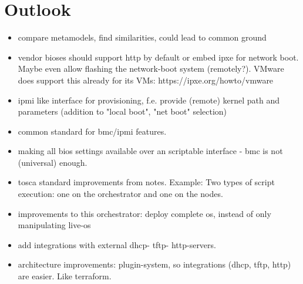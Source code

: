 \chapter{Outlook}



\begin{itemize}
  \item compare metamodels, find similarities, could lead to common ground
  \item vendor bioses should support http by default or embed ipxe for network boot. Maybe even allow flashing the network-boot system (remotely?). VMware does support this already for its VMs: https://ipxe.org/howto/vmware
  \item ipmi like interface for provisioning, f.e. provide (remote) kernel path and parameters (addition to "local boot", "net boot" selection)
  \item common standard for bmc/ipmi features.
  \item making all bios settings available over an scriptable interface - bmc is not (universal) enough.
  \item tosca standard improvements from notes. Example: Two types of script execution: one on the orchestrator and one on the nodes.
  \item improvements to this orchestrator: deploy complete os, instead of only manipulating live-os
  \item add integrations with external dhcp- tftp- http-servers.
  \item architecture improvements: plugin-system, so integrations (dhcp, tftp, http) are easier. Like terraform.
\end{itemize}
